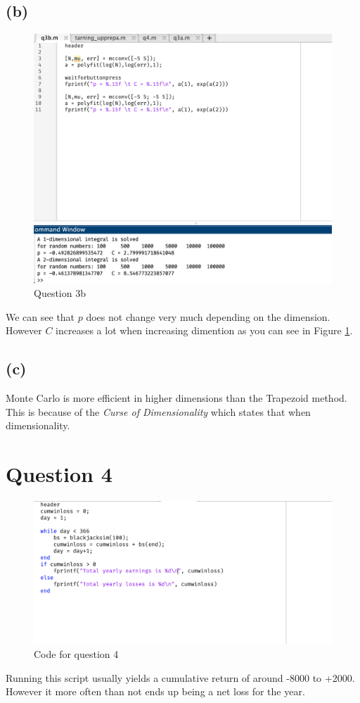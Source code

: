 \documentclass{article}
\begin{document}
\subsection{(b)}

\begin{figure}[H]
    \centering
    \includegraphics[width=\linewidth]{imgs/q3b.png}
    \caption{Question 3b}
    \label{q3b}
\end{figure}
We can see that \( p \) does not change very much depending on the dimension.
However \( C \) increases a lot when increasing dimention as you can see in Figure \ref{q3b}.

\subsection{(c)}

Monte Carlo is more efficient in higher dimensions than the Trapezoid method. This is because of the \textit{Curse of Dimensionality}
which states that when dimensionality.
\newpage
\section{Question 4}

\begin{figure}[H]
    \centering
    \includegraphics[width=0.8\linewidth]{imgs/q4_code.png}
    \caption{Code for question 4}
\end{figure}

Running this script usually yields a cumulative return of around -8000 to +2000. However it more often than not
ends up being a net loss for the year.
\end{document}
